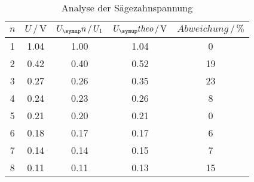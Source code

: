 \begin{table}
  \centering
  \begin{tabular}{c c c c c}
    \toprule
    $n$ & $U \,/\,\si{\volt}$ & $U_\su{n}\,/\,U_1$ & $U_\su{theo}\,/\,\si{\volt}$
    & $Abweichung\,/\, \%$ \\
    \midrule
    1   &   1.04  &   1.00  &   1.04    &   0   \\
    2   &   0.42  &   0.40  &   0.52    &   19   \\
    3   &   0.27  &   0.26  &   0.35    &   23   \\
    4   &   0.24  &   0.23  &   0.26    &   8   \\
    5   &   0.21  &   0.20  &   0.21    &   0   \\
    6   &   0.18  &   0.17  &   0.17    &   6   \\
    7   &   0.14  &   0.14  &   0.15    &   7   \\
    8   &   0.11  &   0.11  &   0.13    &   15   \\
    \bottomrule
  \end{tabular}
  \caption{Analyse der Sägezahnspannung}
  \label{tab:anasaeg}
\end{table}
